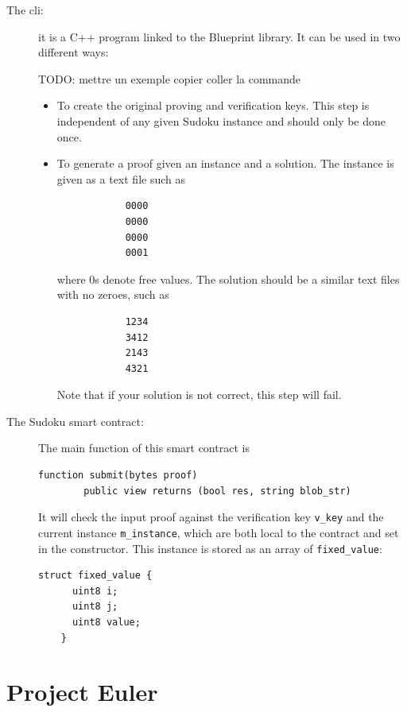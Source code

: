 \documentclass[10pt,a4paper]{article}
\begin{document}
\begin{description}
\item[The cli:] it is a C++ program linked to the Blueprint \zksnarks{} library. It can be used in two different ways:

  TODO: mettre un exemple
  copier coller la commande

	\begin{itemize}
		\item To create the original proving and verification keys. This step is independent of any given Sudoku instance and should only be done once.
		\item To generate a proof given an instance and a solution. The instance is given as a text file such as

		\begin{verbatim}
			0000
			0000
			0000
			0001
		\end{verbatim}

		where $0$s denote free values. The solution should be a similar text files with no zeroes, such as

		\begin{verbatim}
			1234
			3412
			2143
			4321
		\end{verbatim}

		Note that if your solution is not correct, this step will fail.
	\end{itemize}
    \item[The Sudoku smart contract:] The main function of this smart contract is
    \begin{lstlisting}[language=Solidity]
    function submit(bytes proof)
        public view returns (bool res, string blob_str)
    \end{lstlisting}
    It will check the input proof against the verification key
    \lstinline[language=Solidity]|v_key| and the current instance
    \lstinline[language=Solidity]|m_instance|, which are both local to
    the contract and set in the constructor. This instance is stored
    as an array of \lstinline[language=Solidity]|fixed_value|:
    \begin{lstlisting}[language=Solidity]
    struct fixed_value {
      uint8 i;
      uint8 j;
      uint8 value;
    }

    \end{lstlisting}
\end{description}


\section{Project Euler}
\label{section_euler}
\end{document}
